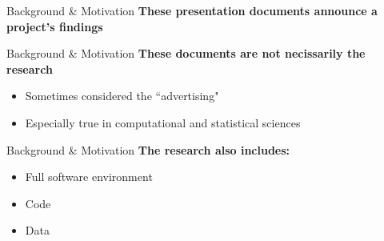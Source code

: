 \documentclass{beamer}\usepackage[]{graphicx}\usepackage[]{color}
\begin{document}
\begin{frame}[t]{Background \& Motivation}
  \textbf{These presentation documents announce a project's findings}
\end{frame}

\begin{frame}[t]{Background \& Motivation}
  \textbf{These documents are not necissarily the research}
  \begin{itemize}
 \item Sometimes considered the ``advertising" \vspace{1cm}
  \item Especially true in computational and statistical sciences
  \end{itemize}
\end{frame}

\begin{frame}[t]{Background \& Motivation}
  \textbf{The research also includes:}
  \begin{itemize}
    \item Full software environment \vspace{1cm}
    \item Code \vspace{1cm}
    \item Data \vspace{1cm}
  \end{itemize}
\end{frame}
\end{document}
